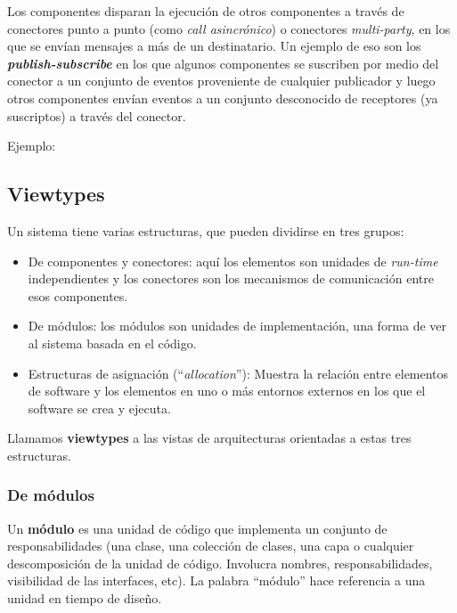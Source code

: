 \documentclass[]{article}
\begin{document}
Los componentes disparan la ejecución de otros componentes a través de conectores punto a punto (como \emph{call asincrónico}) o conectores \emph{multi-party}, en los que se envían mensajes a más de un destinatario. Un ejemplo de eso son los \textbf{\emph{publish-subscribe}} en los que algunos componentes se suscriben por medio del conector a un conjunto de eventos proveniente de cualquier publicador y luego otros componentes envían eventos a un conjunto desconocido de receptores (ya suscriptos) a través del conector.

Ejemplo:


\subsection{Viewtypes}
Un sistema tiene varias estructuras, que pueden dividirse en tres grupos:
\begin{itemize}
    \item De componentes y conectores: aquí los elementos son unidades de \emph{run-time} independientes y los conectores son los mecanismos de comunicación entre esos componentes.
    \item De módulos: los módulos son unidades de implementación, una forma de ver al sistema basada en el código.
    \item Estructuras de asignación (``\emph{allocation}''): Muestra la relación entre elementos de software y los elementos en uno o más entornos externos en los que el software se crea y ejecuta.
\end{itemize}

Llamamos \textbf{viewtypes} a las vistas de arquitecturas orientadas a estas tres estructuras.

\subsubsection{De módulos}
Un \textbf{módulo} es una unidad de código que implementa un conjunto de responsabilidades (una clase, una colección de clases, una capa o cualquier descomposición de la unidad de código. Involucra nombres, responsabilidades, visibilidad de las interfaces, etc). La palabra ``módulo'' hace referencia a una unidad en tiempo de diseño.
\end{document}
